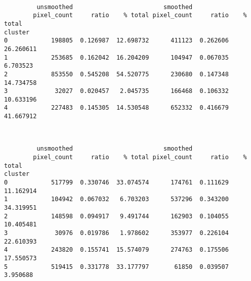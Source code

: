 \documentclass[11pt]{article}
\begin{document}
    
    \begin{center}
    \end{center}
    { \hspace*{\fill} \\}
    
    
    \begin{verbatim}
         unsmoothed                         smoothed                     
        pixel_count     ratio    % total pixel_count     ratio    % total
cluster                                                                  
0            198805  0.126987  12.698732      411123  0.262606  26.260611
1            253685  0.162042  16.204209      104947  0.067035   6.703523
2            853550  0.545208  54.520775      230680  0.147348  14.734758
3             32027  0.020457   2.045735      166468  0.106332  10.633196
4            227483  0.145305  14.530548      652332  0.416679  41.667912
    \end{verbatim}

    
    \begin{center}
    \end{center}
    { \hspace*{\fill} \\}
    
    
    \begin{verbatim}
         unsmoothed                         smoothed                     
        pixel_count     ratio    % total pixel_count     ratio    % total
cluster                                                                  
0            517799  0.330746  33.074574      174761  0.111629  11.162914
1            104942  0.067032   6.703203      537296  0.343200  34.319951
2            148598  0.094917   9.491744      162903  0.104055  10.405481
3             30976  0.019786   1.978602      353977  0.226104  22.610393
4            243820  0.155741  15.574079      274763  0.175506  17.550573
5            519415  0.331778  33.177797       61850  0.039507   3.950688
    \end{verbatim}

    
    \begin{center}
    \end{center}
    { \hspace*{\fill} \\}
    
\end{document}
